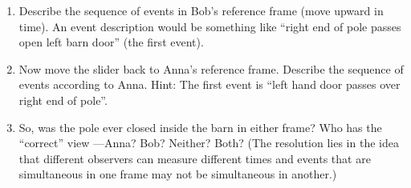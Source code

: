 \begin{enumerate}
\item Describe the sequence of events in Bob's reference frame (move upward in time).  An event description would be something like ``right end of pole passes open left barn door'' (the first event).
\answerspace{1.1in}


\item Now move the slider back to Anna's reference frame. Describe the sequence of events according to Anna.  Hint: The first event is ``left hand door passes over right end of pole''.
\answerspace{1.1in}


\item So, was the pole ever closed inside the barn in either frame? Who has the ``correct'' view —Anna? Bob? Neither? Both?  (The resolution lies in the idea that different observers can measure different times and events that are simultaneous in one frame may not be simultaneous in another.)
\answerspace{1.1in}

\end{enumerate}
